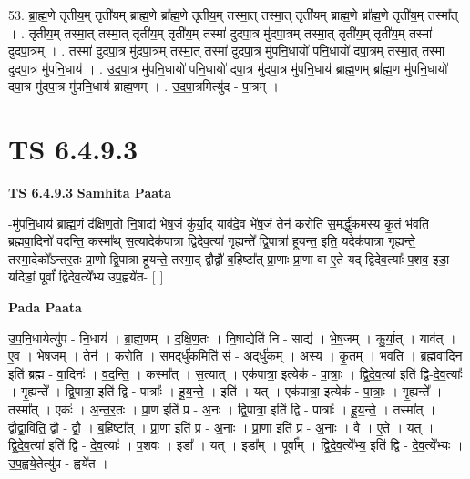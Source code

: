 \documentclass[17pt]{extarticle}
\begin{document}
53. ब्रा॒ह्म॒णे तृती॑य॒म् तृती॑यम् ब्राह्म॒णे ब्रा᳚ह्म॒णे तृती॑य॒म् तस्मा॒त् तस्मा॒त् तृती॑यम् ब्राह्म॒णे ब्रा᳚ह्म॒णे तृती॑य॒म् तस्मा᳚त् । . तृती॑य॒म् तस्मा॒त् तस्मा॒त् तृती॑य॒म् तृती॑य॒म् तस्मा॑ दुदपा॒त्र मु॑दपा॒त्रम् तस्मा॒त् तृती॑य॒म् तृती॑य॒म् तस्मा॑ दुदपा॒त्रम् । . तस्मा॑ दुदपा॒त्र मु॑दपा॒त्रम् तस्मा॒त् तस्मा॑ दुदपा॒त्र मु॑पनि॒धायो॑ पनि॒धायो॑ दपा॒त्रम् तस्मा॒त् तस्मा॑ दुदपा॒त्र मु॑पनि॒धाय॑ । . उ॒द॒पा॒त्र मु॑पनि॒धायो॑ पनि॒धायो॑ दपा॒त्र मु॑दपा॒त्र मु॑पनि॒धाय॑ ब्राह्म॒णम् ब्रा᳚ह्म॒ण मु॑पनि॒धायो॑ दपा॒त्र मु॑दपा॒त्र मु॑पनि॒धाय॑ ब्राह्म॒णम् । . उ॒द॒पा॒त्रमित्यु॑द - पा॒त्रम् । \newline
\pagebreak
{}

\section{ TS 6.4.9.3 }

\textbf{TS 6.4.9.3 } \newline
\textbf{Samhita Paata} \newline

-मु॑पनि॒धाय॑ ब्राह्म॒णं द॑क्षिण॒तो नि॒षाद्य॑ भेष॒जं कु॑र्या॒द् याव॑दे॒व भे॑ष॒जं तेन॑ करोति स॒मर्द्धु॑कमस्य कृ॒तं भ॑वति ब्रह्मवा॒दिनो॑ वदन्ति॒  कस्मा᳚थ् स॒त्यादेक॑पात्रा द्विदेव॒त्या॑ गृ॒ह्यन्ते᳚ द्वि॒पात्रा॑ हूयन्त॒ इति॒ यदेक॑पात्रा गृ॒ह्यन्ते॒ तस्मा॒देको᳚ऽन्तर॒तः प्रा॒णो द्वि॒पात्रा॑ हूयन्ते॒ तस्मा॒द् द्वौद्वौ॑ ब॒हिष्टा᳚त् प्रा॒णाः प्रा॒णा वा ए॒ते यद् द्वि॑देव॒त्याः᳚ प॒शव॒ इडा॒ यदिडां॒ पूर्वां᳚ द्विदेव॒त्ये᳚भ्य उप॒ह्वये॑त- [  ] \newline

\textbf{Pada Paata} \newline

उ॒प॒नि॒धायेत्यु॑प - नि॒धाय॑ । ब्रा॒ह्म॒णम् । द॒क्षि॒ण॒तः । नि॒षाद्येति॑ नि - साद्य॑ । भे॒ष॒जम् । कु॒र्या॒त् । याव॑त् । ए॒व । भे॒ष॒जम् । तेन॑ । क॒रो॒ति॒ । स॒मद्‌र्धु॑क॒मिति॑ सं - अद्‌र्धु॑कम् । अ॒स्य॒ । कृ॒तम् । भ॒व॒ति॒ । ब्र॒ह्म॒वा॒दिन॒ इति॑ ब्रह्म - वा॒दिनः॑ । व॒द॒न्ति॒ । कस्मा᳚त् । स॒त्यात् । एक॑पात्रा॒ इत्येक॑ - पा॒त्राः॒ । द्वि॒दे॒व॒त्या॑ इति॑ द्वि-दे॒व॒त्याः᳚ । गृ॒ह्यन्ते᳚ । द्वि॒पात्रा॒ इति॑ द्वि - पात्राः᳚ । हू॒य॒न्ते॒ । इति॑ । यत् । एक॑पात्रा॒ इत्येक॑ - पा॒त्राः॒ । गृ॒ह्यन्ते᳚ । तस्मा᳚त् । एकः॑ । अ॒न्त॒र॒तः । प्रा॒ण इति॑ प्र - अ॒नः । द्वि॒पात्रा॒ इति॑ द्वि - पात्राः᳚ । हू॒य॒न्ते॒ । तस्मा᳚त् । द्वौद्वा॒विति॒ द्वौ - द्वौ॒ । ब॒हिष्टा᳚त् । प्रा॒णा इति॑ प्र - अ॒नाः । प्रा॒णा इति॑ प्र - अ॒नाः । वै । ए॒ते । यत् । द्वि॒दे॒व॒त्या॑ इति॑ द्वि - दे॒व॒त्याः᳚ । प॒शवः॑ । इडा᳚ । यत् । इडा᳚म् । पूर्वा᳚म् । द्वि॒दे॒व॒त्ये᳚भ्य॒ इति॑ द्वि - दे॒व॒त्ये᳚भ्यः । उ॒प॒ह्वये॒तेत्यु॑प - ह्वये॑त ।  \newline
\end{document}
